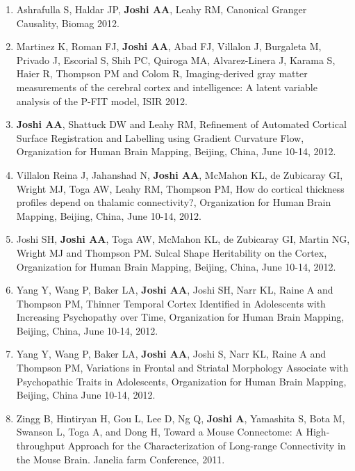 \documentclass[overlapped,line,letterpaper]{res}
\begin{document}
\begin{resume}
\begin{enumerate}
    \item Ashrafulla S, Haldar JP, \textbf{Joshi AA}, Leahy RM, {Canonical Granger Causality}, Biomag 2012.

    \item Martinez K, Roman FJ, \textbf{Joshi AA}, Abad FJ, Villalon J, Burgaleta M, Privado J, Escorial S, Shih PC, Quiroga MA, Alvarez-Linera J, Karama S, Haier R, Thompson PM and Colom R, {Imaging-derived gray matter measurements of the cerebral cortex and intelligence: A latent variable analysis of the P-FIT model}, ISIR 2012.

    \item \textbf{Joshi AA}, Shattuck DW and Leahy RM, {Refinement of Automated Cortical Surface Registration and Labelling using Gradient Curvature Flow}, Organization for Human Brain Mapping, Beijing, China, June 10-14, 2012.

    \item Villalon Reina J, Jahanshad N, \textbf{Joshi AA}, McMahon KL, de Zubicaray GI, Wright MJ, Toga AW, Leahy RM, Thompson PM, {How do cortical thickness profiles depend on thalamic connectivity?}, Organization for Human Brain Mapping, Beijing, China, June 10-14, 2012.

    \item Joshi SH, \textbf{Joshi AA}, Toga AW, McMahon KL, de Zubicaray GI, Martin NG, Wright MJ and Thompson PM. {Sulcal Shape Heritability on the Cortex}, Organization for Human Brain Mapping, Beijing, China, June 10-14, 2012.

    \item Yang Y, Wang P, Baker LA, \textbf{Joshi AA}, Joshi SH, Narr KL, Raine A and Thompson PM, {Thinner Temporal Cortex Identified in Adolescents with Increasing Psychopathy over Time}, Organization for Human Brain Mapping, Beijing, China, June 10-14, 2012.

    \item Yang Y, Wang P, Baker LA, \textbf{Joshi AA}, Joshi S, Narr KL, Raine A and Thompson PM, {Variations in Frontal and Striatal Morphology Associate with Psychopathic Traits in Adolescents}, Organization for Human Brain Mapping, Beijing, China June 10-14, 2012.

    \item Zingg B, Hintiryan H, Gou L, Lee D, Ng Q, \textbf{Joshi A}, Yamashita S, Bota M, Swanson L, Toga A, and Dong H, {Toward a Mouse Connectome: A High-throughput Approach for the Characterization of Long-range Connectivity in the Mouse Brain}. Janelia farm Conference, 2011.


\end{enumerate}
\end{resume}
\end{document}
